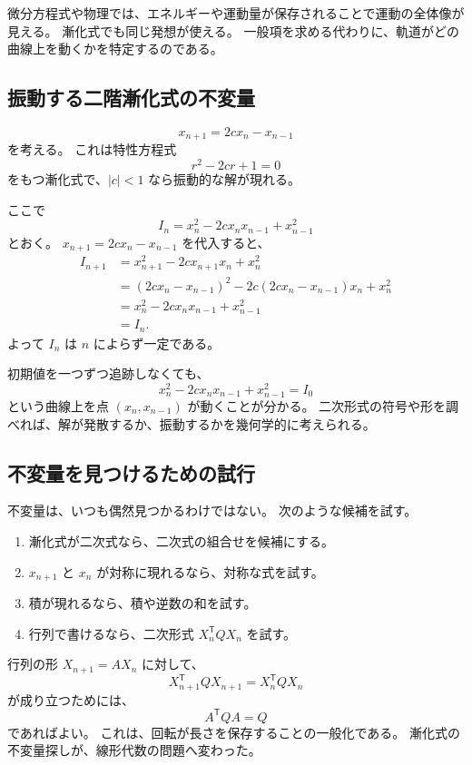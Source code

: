 微分方程式や物理では、エネルギーや運動量が保存されることで運動の全体像が見える。
漸化式でも同じ発想が使える。
一般項を求める代わりに、軌道がどの曲線上を動くかを特定するのである。

\subsection{振動する二階漸化式の不変量}

\[
  x_{n+1}=2c x_n-x_{n-1}
\]
を考える。
これは特性方程式
\[
  r^2-2cr+1=0
\]
をもつ漸化式で、$|c|<1$ なら振動的な解が現れる。

ここで
\[
  I_n=x_n^2-2c x_nx_{n-1}+x_{n-1}^2
\]
とおく。
$x_{n+1}=2cx_n-x_{n-1}$ を代入すると、
\[
\begin{aligned}
 I_{n+1}
 &=x_{n+1}^2-2cx_{n+1}x_n+x_n^2\\
 &=(2cx_n-x_{n-1})^2
   -2c(2cx_n-x_{n-1})x_n+x_n^2\\
 &=x_n^2-2cx_nx_{n-1}+x_{n-1}^2\\
 &=I_n.
\end{aligned}
\]
よって $I_n$ は $n$ によらず一定である。

初期値を一つずつ追跡しなくても、
\[
  x_n^2-2c x_nx_{n-1}+x_{n-1}^2=I_0
\]
という曲線上を点 $(x_n,x_{n-1})$ が動くことが分かる。
二次形式の符号や形を調べれば、解が発散するか、振動するかを幾何学的に考えられる。

\subsection{不変量を見つけるための試行}

不変量は、いつも偶然見つかるわけではない。
次のような候補を試す。

\begin{enumerate}
  \item 漸化式が二次式なら、二次式の組合せを候補にする。
  \item $x_{n+1}$ と $x_n$ が対称に現れるなら、対称な式を試す。
  \item 積が現れるなら、積や逆数の和を試す。
  \item 行列で書けるなら、二次形式 $X_n^{\mathsf T}QX_n$ を試す。
\end{enumerate}

行列の形 $X_{n+1}=AX_n$ に対して、
\[
  X_{n+1}^{\mathsf T}QX_{n+1}
  =X_n^{\mathsf T}QX_n
\]
が成り立つためには、
\[
  A^{\mathsf T}QA=Q
\]
であればよい。
これは、回転が長さを保存することの一般化である。
漸化式の不変量探しが、線形代数の問題へ変わった。

